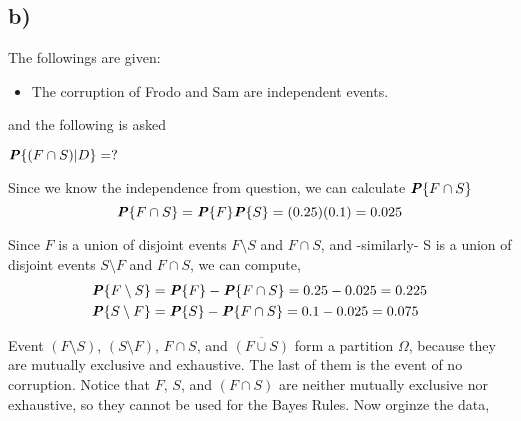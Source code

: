 \documentclass[12pt]{article}
\newcommand{\prob}[1]{\textbf{\textit{P}}\{#1\}}
\begin{document}
\subsection*{b)}

\noindent The followings are given:

\begin{itemize}
    \item The corruption of Frodo and Sam are independent events.
\end{itemize}

\noindent and the following is asked

$\prob{(F \cap S) | D} = ?$

\noindent Since we know the independence from question, we can calculate $\prob{F \cap S}$
\begin{equation}
    \prob{F \cap S} = \prob{F} \prob{S} = (0.25)(0.1) = 0.025
\end{equation}

\noindent Since $F$ is a union of disjoint events $F \setminus S$ and $F \cap S$, and -similarly- S is a union of disjoint events $S \setminus F$ and $F \cap S$, we can compute,
\begin{align}
    \prob{F \setminus S} &= \prob{F} - \prob{F \cap S} = 0.25 - 0.025 = 0.225\\
    \prob{S \setminus F} &= \prob{S} - \prob{F \cap S} = 0.1 - 0.025 = 0.075
\end{align}

Event $(F \setminus S)$, $(S \setminus F)$, $F \cap S$, and $\overline{(F \cup S)}$ form a partition $\Omega$, because they are mutually exclusive and exhaustive. The last of them is the event of no corruption. Notice that $F$, $S$, and $(F \cap S)$ are neither mutually exclusive nor exhaustive, so they cannot be used for the Bayes Rules. Now orginze the data,
\end{document}
